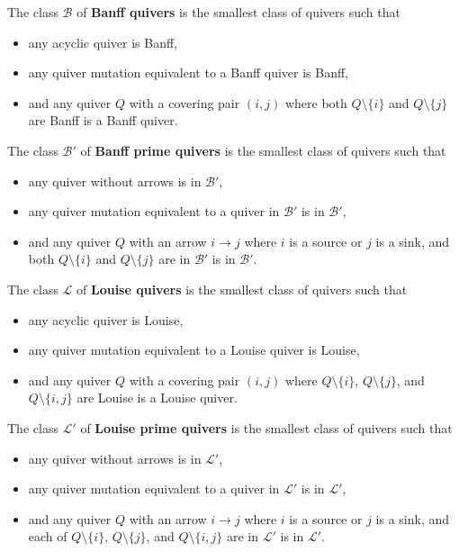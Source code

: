 \documentclass[ALCO,Unicode]{cedram}
\newcommand{\BB}{\mathcal{B}}
\newcommand{\LL}{\mathcal{L}}
\begin{document}
\begin{defi}\label{def-banff}
    The class $\BB$ of \textbf{Banff quivers} is the smallest class of quivers such that 
    \begin{itemize}
        \item any acyclic quiver is Banff,
        \item any quiver mutation equivalent to a Banff quiver is Banff, 
        \item and any quiver $Q$ with a covering pair $(i,j)$ where both $Q\setminus \{i\}$ and $Q\setminus \{j\}$ are Banff is a Banff quiver.
    \end{itemize}
 \end{defi}

 \begin{defi}\label{def-banffprime}
    The class $\BB'$ of \textbf{Banff prime quivers} is the smallest class of quivers such that
    \begin{itemize}
        \item any quiver without arrows is in $\BB'$,
        \item any quiver mutation equivalent to a quiver in $\BB'$ is in $\BB'$, 
        \item and any quiver $Q$ with an arrow $i \to j$ where $i$ is a source or $j$ is a sink, and both $Q\setminus \{i\}$ and $Q\setminus \{j\}$ are in $\BB'$ is in $\BB'$.
    \end{itemize}
 \end{defi}

 \begin{defi}\label{def-louise}
    The class $\LL$ of \textbf{Louise quivers} is the smallest class of quivers such that 
    \begin{itemize}
        \item any acyclic quiver is Louise,
        \item any quiver mutation equivalent to a Louise quiver is Louise, 
        \item and any quiver $Q$ with a covering pair $(i,j)$ where $Q\setminus \{i\}$, $Q\setminus \{j\}$, and $Q\setminus \{i,j\}$ are Louise is a Louise quiver.
    \end{itemize}
 \end{defi}

 \begin{defi}\label{def-louiseprime}
    The class $\LL'$ of \textbf{Louise prime quivers} is the smallest class of quivers such that 
    \begin{itemize}
        \item any quiver without arrows is in $\LL'$,
        \item any quiver mutation equivalent to a quiver in $\LL'$ is in $\LL'$, 
        \item and any quiver $Q$ with an arrow $i \to j$ where $i$ is a source or $j$ is a sink, and each of $Q\setminus \{i\}$, $Q\setminus \{j\}$, and $Q\setminus \{i,j\}$ are in $\LL'$ is in $\LL'$.
    \end{itemize}
 \end{defi}
\end{document}
